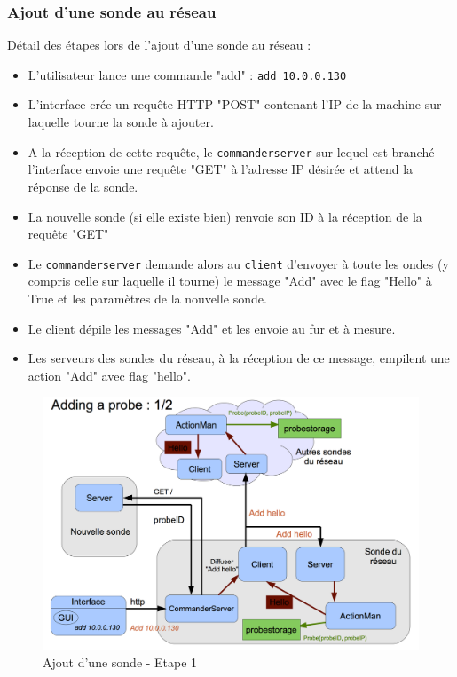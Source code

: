 \documentclass[a4paper,11pt]{article}
\begin{document}
\subsubsection{Ajout d'une sonde au réseau}

Détail des étapes lors de l'ajout d'une sonde au réseau :
\begin{itemize}
\item L'utilisateur lance une commande "add" : \texttt{add 10.0.0.130}
\item L'interface crée un requête HTTP "POST" contenant l'IP de la machine sur laquelle tourne la sonde à ajouter.
\item A la réception de cette requête, le \texttt{commanderserver} sur lequel est branché l'interface envoie une requête "GET" à l'adresse IP désirée et attend la réponse de la sonde.
\item La nouvelle sonde (si elle existe bien) renvoie son ID à la réception de la requête "GET"
\item Le \texttt{commanderserver} demande alors au \texttt{client} d'envoyer à toute les ondes (y compris celle sur laquelle il tourne) le message "Add" avec le flag "Hello" à True et les paramètres de la nouvelle sonde.
\item Le client dépile les messages "Add" et les envoie au fur et à mesure.
\item Les serveurs des sondes du réseau, à la réception de ce message, empilent une action "Add" avec flag "hello".
\end{itemize}

\begin{figure}[!ht]
\centering\includegraphics[width=0.8\linewidth]{img/graphAdd1.png}
\caption{Ajout d'une sonde - Etape 1}
\end{figure}
\end{document}
